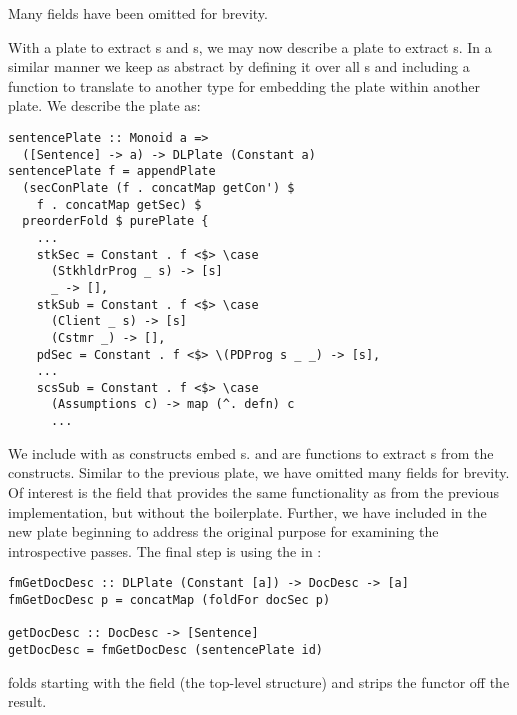Many fields have been omitted for brevity. 

With a plate to extract s and s, we may now describe a plate to extract s. In a similar manner we keep  as abstract by defining it over all s and including a function to translate  to another type for embedding the plate within another plate. We describe the plate as:
\clearpage
\begin{tcolorbox}
\begin{verbatim}
sentencePlate :: Monoid a =>
  ([Sentence] -> a) -> DLPlate (Constant a)
sentencePlate f = appendPlate
  (secConPlate (f . concatMap getCon') $
    f . concatMap getSec) $
  preorderFold $ purePlate {
    ...
    stkSec = Constant . f <$> \case
      (StkhldrProg _ s) -> [s]
      _ -> [],
    stkSub = Constant . f <$> \case
      (Client _ s) -> [s]
      (Cstmr _) -> [],
    pdSec = Constant . f <$> \(PDProg s _ _) -> [s],
    ...
    scsSub = Constant . f <$> \case
      (Assumptions c) -> map (^. defn) c
      ...
\end{verbatim}
\end{tcolorbox}

We include  with  as  constructs embed s.  and  are functions to extract s from the  constructs. Similar to the previous plate, we have omitted many fields for brevity. Of interest is the  field that provides the same functionality as  from the previous implementation, but without the boilerplate. Further, we have included  in the new plate beginning to address the original purpose for examining the introspective passes. The final step is using the  in :

\begin{tcolorbox}
\begin{verbatim}
fmGetDocDesc :: DLPlate (Constant [a]) -> DocDesc -> [a]
fmGetDocDesc p = concatMap (foldFor docSec p)

getDocDesc :: DocDesc -> [Sentence]
getDocDesc = fmGetDocDesc (sentencePlate id)
\end{verbatim}
\end{tcolorbox}

 folds  starting with the  field (the top-level structure) and strips the  functor off the result.

